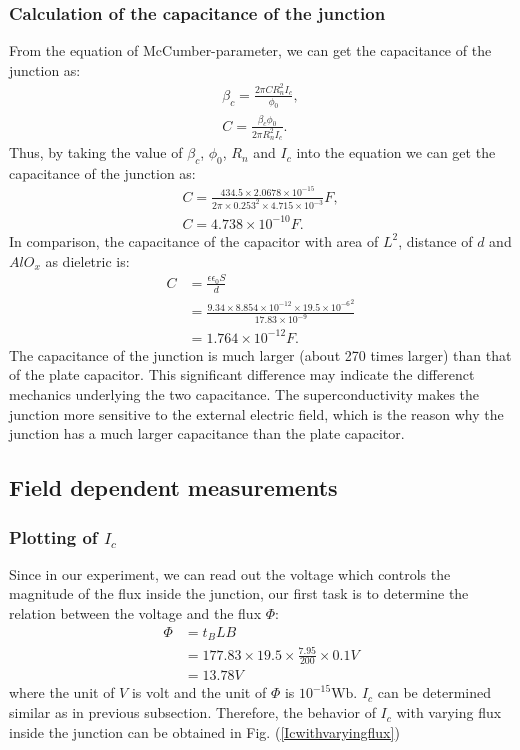 \subsubsection{Calculation of the capacitance of the junction}
From the equation of McCumber-parameter, we can get the capacitance of the junction as:
\begin{align*}
    \beta_c=\frac{2\pi{C}{R_{n}^2}I_{c}}{\phi_{0}},\\
    C=\frac{\beta_c\phi_{0}}{2\pi{R_{n}^2}I_{c}}.
\end{align*}
Thus, by taking the value of $\beta_{c}$, $\phi_{0}$, $R_{n}$ and $I_{c}$ into the equation we can get the capacitance of the junction as:
\begin{align*}
    C=\frac{434.5\times2.0678\times10^{-15}}{2\pi\times0.253^2\times4.715\times10^{-3}}F,\\
    C=4.738\times10^{-10}F.
\end{align*}
In comparison, the capacitance of the capacitor with area of $L^2$, distance of $d$ and $AlO_{x}$ as dieletric is:
\begin{align*}
    C & =\frac{\epsilon\epsilon_{0}S}{d}\\
    & =\frac{9.34\times8.854\times10^{-12}\times{19.5\times10^{-6}}^2}{17.83\times10^{-9}}\\
    & =1.764\times10^{-12}F.
\end{align*}
The capacitance of the junction is much larger (about 270 times larger) than that of the plate capacitor. This significant difference may indicate the differenct mechanics underlying the two capacitance. The superconductivity makes the junction more sensitive to the external electric field, which is the reason why the junction has a much larger capacitance than the plate capacitor.
\subsection{Field dependent measurements}
\subsubsection{Plotting of $I_{c}$}

Since in our experiment, we can read out the voltage which controls
the magnitude of the flux inside the junction, our first task is to
determine the relation between the voltage and the flux $\Phi$:
\begin{align*}
\Phi & =t_{B}LB\\
 & =177.83\times19.5\times\frac{7.95}{200}\times0.1V\\
 & =13.78V
\end{align*}
where the unit of $V$ is volt and the unit of $\Phi$ is $10^{-15}\mathrm{Wb}$.
$I_{c}$ can be determined similar as in previous subsection. Therefore,
the behavior of $I_{c}$ with varying flux inside the junction can
be obtained in Fig. (\ref{Icwithvaryingflux})

